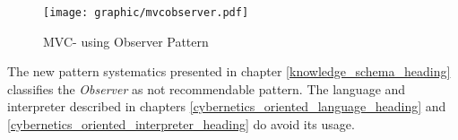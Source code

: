 \begin{figure}[ht]
    \begin{center}
        \texttt{[image: graphic/mvcobserver.pdf]}
        \caption{MVC- using Observer Pattern}
        \label{mvcobserver_figure}
    \end{center}
\end{figure}

The new pattern systematics presented in chapter \ref{knowledge_schema_heading}
classifies the \emph{Observer} as not recommendable pattern. The language and
interpreter described in chapters \ref{cybernetics_oriented_language_heading}
and \ref{cybernetics_oriented_interpreter_heading} do avoid its usage.
